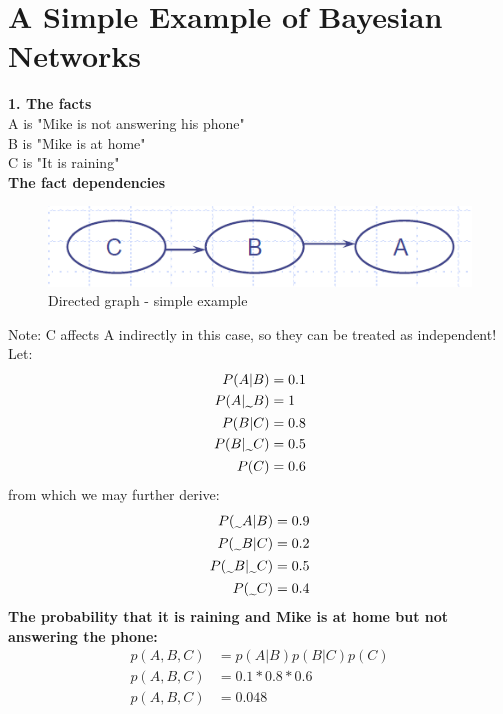 \documentclass{article}
\newcommand{\midtilde}{\raisebox{-0.25\baselineskip}{\textasciitilde}}
\begin{document}
\section*{A Simple Example of Bayesian Networks} 

\textbf{1. The facts}\\
A is "Mike is not answering his phone" \\
B is "Mike is at home"\\
C is "It is raining"\\
\textbf{The fact dependencies} \\

\begin{figure}[H]
 \centering 
\includegraphics[scale=0.42]{images/mike-phone.png} 
 \caption{Directed graph - simple example}
 \label{fig:Mike}
\end{figure}
Note: C affects A indirectly in this case, so they can be treated as independent! \\
Let:
\begin{align*}
 P(A|B)& = 0.1 \\
 P(A|\midtilde B) & = 1 \\
P(B|C) & = 0.8 \\ 
P(B|\midtilde C) & = 0.5 \\
P(C) & = 0.6    \\
\end{align*}
from which we may further derive:
\begin{align*}
 P(\midtilde A|B)& = 0.9 \\
P(\midtilde B|C) & = 0.2 \\ 
P(\midtilde  B|\midtilde C) & = 0.5 \\
P(\midtilde  C) & = 0.4    \\
\end{align*}
\textbf{The probability that it is raining and Mike is at home but not answering the phone:} \\
\begin{align*}
p(A,B,C) & = p(A|B)p(B|C)p(C) \\
p(A,B,C) & = 0.1 * 0.8 * 0.6 \\
p(A,B,C) & = 0.048 \\
\end{align*}
\end{document}

